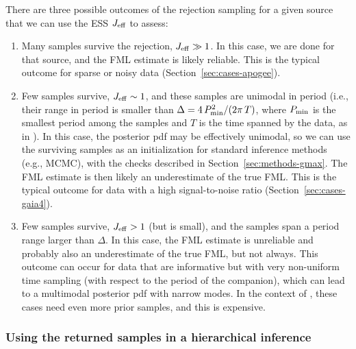 \documentclass[twocolumn]{AASTeX7/aastex701}
\newcommand{\harv}{\package{harv}}
\begin{document}
There are three possible outcomes of the rejection sampling for a given source that we
can use the ESS $J_{\rm eff}$ to assess:
\begin{enumerate}
  \item Many samples survive the rejection, $J_{\rm eff} \gg 1$. In this case, we are
    done for that source, and the FML estimate is likely reliable. This is the typical
    outcome for sparse or noisy data (Section~\ref{sec:cases-apogee}).
  \item Few samples survive, $J_{\rm eff} \sim 1$, and these samples are unimodal in
    period (i.e., their range in period is smaller than $\Delta = 4\,P_{\rm min}^2 /
    (2\pi\,T)$, where $P_{\rm min}$ is the smallest period among the samples and $T$ is
    the time spanned by the data, as in \citealt{Price-Whelan:2017}). In this case, the
    posterior pdf may be effectively unimodal, so we can use the surviving samples as an
    initialization for standard inference methods (e.g., MCMC), with the checks
    described in Section~\ref{sec:methods-gmax}. The FML estimate is then likely an
    underestimate of the true FML. This is the typical outcome for data
    with a high signal-to-noise ratio (Section~\ref{sec:cases-gaia4}).
  \item Few samples survive, $J_{\rm eff} > 1$ (but is small), and the samples span a
    period range larger than $\Delta$.
    In this case, the FML estimate is unreliable and probably also an underestimate of
    the true FML, but not always.
    This outcome can occur for data that are informative but with very non-uniform time
    sampling (with respect to the period of the companion), which can lead to a
    multimodal posterior pdf with narrow modes.
    In the context of \harv, these cases need even more prior samples, and this is
    expensive.
\end{enumerate}

\subsubsection{Using the returned samples in a hierarchical inference}
\end{document}

